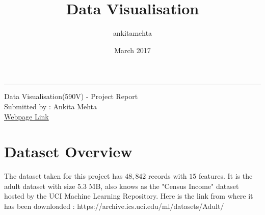 \documentclass{article}
\title{Data Visualisation}
\author{ankitamehta }
\date{March 2017}
\begin{document}
\hrule height 1pt
\vspace{1em}
\begin{center}
\large{Data Visualisation(590V) - Project Report }\\
\large{Submitted by : Ankita Mehta }\\
\large{\href{http://www-edlab.cs.umass.edu/~amehta/}{Webpage Link}}
\end{center}
\par
\section*{Dataset Overview}
The dataset taken for this project has $48,842$ records with $15$ features. It is the adult dataset with size 5.3 MB, also knows as the "Census Income" dataset hosted by the UCI Machine Learning Repository. 
Here is the link from where it has been downloaded : https://archive.ics.uci.edu/ml/datasets/Adult/ \\
\end{document}
